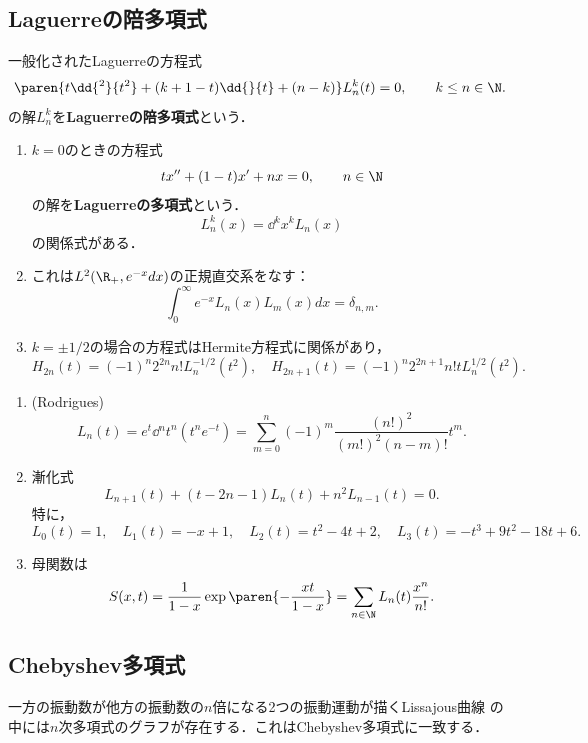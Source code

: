 \documentclass[uplatex,dvipdfmx]{jsreport}
\begin{document}
\subsection{Laguerreの陪多項式}

\begin{problem}\label{prob-Laguerre}
    一般化されたLaguerreの方程式
    \[\paren{t\dd{^2}{t^2}+(k+1-t)\dd{}{t}+(n-k)}L^k_n(t)=0,\qquad k\le n\in\N.\]
    の解$L^k_n$を\textbf{Laguerreの陪多項式}という．
    \begin{enumerate}
        \item $k=0$のときの方程式
        \[tx''+(1-t)x'+nx=0,\qquad n\in\N\]
        の解を\textbf{Laguerreの多項式}という．
        \[L^k_n(x)=\dd{^k}{x^k}L_n(x)\]
        の関係式がある．
        \item これは$L^2(\R_+,e^{-x}dx)$の正規直交系をなす：
        \[\int_0^\infty e^{-x}L_n(x)L_m(x)dx=\delta_{n,m}.\]
        \item $k=\pm1/2$の場合の方程式はHermite方程式に関係があり，
        \[H_{2n}(t)=(-1)^n2^{2n}n!L_n^{-1/2}(t^2),\quad H_{2n+1}(t)=(-1)^n2^{2n+1}n!tL_n^{1/2}(t^2).\]
    \end{enumerate}
\end{problem}

\begin{proposition}\mbox{}
    \begin{enumerate}
        \item (Rodrigues) 
        \[L_n(t)=e^t\dd{^n}{t^n}(t^ne^{-t})=\sum_{m=0}^n(-1)^m\frac{(n!)^2}{(m!)^2(n-m)!}t^m.\]
        \item 漸化式
        \[L_{n+1}(t)+(t-2n-1)L_n(t)+n^2L_{n-1}(t)=0.\]
        特に，
        \[L_0(t)=1,\quad L_1(t)=-x+1,\quad L_2(t)=t^2-4t+2,\quad L_3(t)=-t^3+9t^2-18t+6.\]
        \item 母関数は
        \[S(x,t)=\frac{1}{1-x}\exp\paren{-\frac{xt}{1-x}}=\sum_{n\in\N}L_n(t)\frac{x^n}{n!}.\]
    \end{enumerate}
\end{proposition}

\subsection{Chebyshev多項式}

\begin{tcolorbox}[colframe=ForestGreen, colback=ForestGreen!10!white,breakable,colbacktitle=ForestGreen!40!white,coltitle=black,fonttitle=\bfseries\sffamily,
title=]
    一方の振動数が他方の振動数の$n$倍になる2つの振動運動が描くLissajous曲線
    の中には$n$次多項式のグラフが存在する．これはChebyshev多項式に一致する\cite{Arnold-Mechanics}．
\end{tcolorbox}
\end{document}
